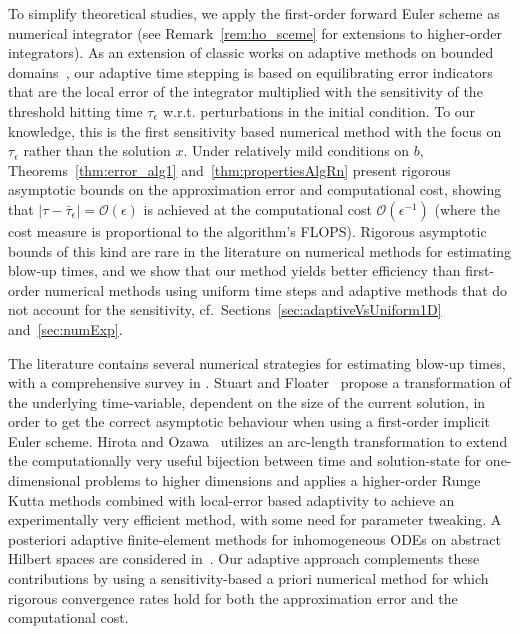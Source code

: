 \documentclass[a4paper, oneside, reqno]{amsart}
\theoremstyle{remark}
\begin{document}
To simplify theoretical studies, we apply the first-order forward Euler scheme as numerical integrator (see Remark~\ref{rem:ho_sceme} for extensions to higher-order integrators). 
As an extension of classic works on adaptive methods on bounded domains~\cite{Bangerth2003,Chaudhry2021,Eriksson1995,Moon2003}, our adaptive time stepping is based on equilibrating error indicators that are the local error of the integrator multiplied with the sensitivity of the threshold hitting time $\tau_\epsilon$ w.r.t. perturbations in the initial condition.
To our knowledge, this is the first sensitivity based numerical method with the focus on \(\tau_\epsilon\) rather than the solution \(x\).
Under relatively mild conditions on \(b\), Theorems~\ref{thm:error_alg1} and~\ref{thm:propertiesAlgRn} present rigorous asymptotic bounds on the approximation error and computational cost, showing that \(|\tau - \bar \tau_\epsilon| = \mathcal{O}(\epsilon)\)  is achieved at the computational cost \(\mathcal{O}(\epsilon^{-1})\) (where the cost measure is proportional to the algorithm's FLOPS).
Rigorous asymptotic bounds of this kind are rare in the literature on numerical methods for estimating blow-up times, and we show that our method
yields better efficiency than first-order numerical methods using uniform time steps and adaptive methods that do not account for the sensitivity, cf.~Sections~\ref{sec:adaptiveVsUniform1D} and~\ref{sec:numExp}.

The literature contains several numerical strategies for estimating blow-up times, with a comprehensive survey in \cite{Bandle1998}. 
Stuart and Floater~\cite{Stuart90} propose a transformation of the underlying time-variable, dependent on the size of the current solution, in order to get the correct asymptotic behaviour when using a  first-order implicit Euler scheme. Hirota and Ozawa~\cite{Hirota2006} utilizes an arc-length transformation to extend the computationally very useful bijection between time and solution-state for one-dimensional problems to higher dimensions and applies a higher-order Runge Kutta methods combined with local-error based adaptivity to achieve an experimentally very efficient method, with some need for parameter tweaking. A posteriori adaptive finite-element methods for inhomogeneous ODEs on abstract Hilbert spaces are considered in~\cite{Holm2018,Cangiani2016}. Our adaptive approach complements these contributions by using a sensitivity-based a priori numerical method for which rigorous convergence rates hold for both the approximation error and the computational cost. 
\end{document}
